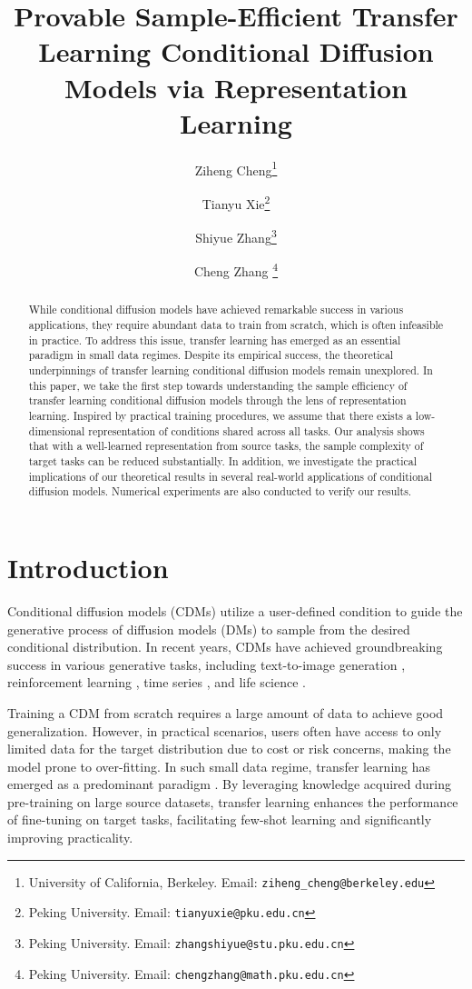 \documentclass[11pt]{article}
\title{Provable Sample-Efficient Transfer Learning Conditional Diffusion Models via Representation Learning}
\author{
Ziheng Cheng\thanks{University of California, Berkeley. Email: \texttt{ziheng\_cheng@berkeley.edu}}
\and Tianyu Xie\thanks{Peking University. Email: \texttt{tianyuxie@pku.edu.cn}}
\and Shiyue Zhang\thanks{Peking University. Email: \texttt{zhangshiyue@stu.pku.edu.cn}}
\and Cheng Zhang \thanks{Peking University. Email: \texttt{chengzhang@math.pku.edu.cn}}
}
\date{}
\numberwithin{equation}{section}
\begin{document}
\maketitle

\begin{abstract}
    While conditional diffusion models have achieved remarkable success in various applications, they require abundant data to train from scratch, which is often infeasible in practice.
    To address this issue, transfer learning has emerged as an essential paradigm in small data regimes.
    Despite its empirical success, the theoretical underpinnings of transfer learning conditional diffusion models remain unexplored.
    In this paper, we take the first step towards understanding the sample efficiency of transfer learning conditional diffusion models through the lens of representation learning.
    Inspired by practical training procedures, we assume that there exists a low-dimensional representation of conditions shared across all tasks.
    Our analysis shows that with a well-learned representation from source tasks, the sample
    complexity of target tasks can be reduced substantially.
    In addition, we investigate the practical implications of our theoretical results in several real-world applications of conditional diffusion models.
    Numerical experiments are also conducted to verify our results.
\end{abstract}

\section{Introduction}

Conditional diffusion models (CDMs) utilize a user-defined condition to guide the generative process of diffusion models (DMs) to sample from the desired conditional distribution.
In recent years, CDMs have achieved groundbreaking success in various generative tasks, including text-to-image generation \citep{ho2020denoising,song2020score,ho2022classifier,rombach2022high}, reinforcement learning \citep{janner2022planning,chi2023diffusion,wang2022diffusion,reuss2023goal}, time series \citep{tashiro2021csdi,rasul2021autoregressive}, and life science \citep{song2021solving,watson2022broadly,gruver2024protein,guo2024diffusion}. 

Training a CDM from scratch requires a large amount of data to achieve good generalization.
However, in practical scenarios, users often have access to only limited data for the target distribution due to cost or risk concerns, making the model prone to over-fitting. 
In such small data regime, transfer learning has emerged as a predominant paradigm \citep{moon2022fine,ruiz2023dreambooth,xie2023difffit,han2023svdiff}.
By leveraging knowledge acquired during pre-training on large source datasets, transfer learning enhances the performance of fine-tuning on target tasks, facilitating few-shot learning and significantly improving practicality.
\end{document}
